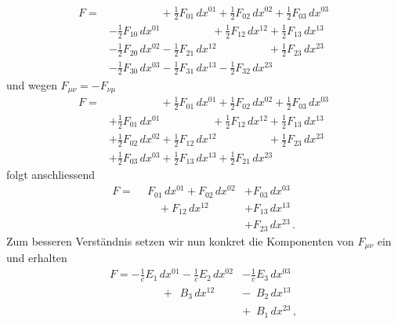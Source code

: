 \begin{align*}
	F
	=
	&\phantom{+ \frac{1}{2} F_{00} \, dx^{00}} + \frac{1}{2} F_{01} \, dx^{01} + \frac{1}{2} F_{02} \, dx^{02} + \frac{1}{2} F_{03} \, dx^{03}
	\\
	&- \frac{1}{2} F_{10} \, dx^{01} \phantom{+ \frac{1}{2} F_{11} \, dx^{11}} + \frac{1}{2} F_{12} \, dx^{12} + \frac{1}{2} F_{13} \, dx^{13}
	\\
	&- \frac{1}{2} F_{20} \, dx^{02} - \frac{1}{2} F_{21} \, dx^{12} \phantom{+ \frac{1}{2} F_{22} \, dx^{22}} + \frac{1}{2} F_{23} \, dx^{23}
	\\
	&- \frac{1}{2} F_{30} \, dx^{03} - \frac{1}{2} F_{31} \, dx^{13} - \frac{1}{2} F_{32} \, dx^{23} \phantom{+ \frac{1}{2} F_{33} \, dx^{33}}
\end{align*}
und wegen $F_{\mu\nu} = -F_{\nu\mu}$
\begin{align*}
	F
	=
	&\phantom{+ \frac{1}{2} F_{00} \, dx^{00}} + \frac{1}{2} F_{01} \, dx^{01} + \frac{1}{2} F_{02} \, dx^{02} + \frac{1}{2} F_{03} \, dx^{03}
	\\
	&+ \frac{1}{2} F_{01} \, dx^{01} \phantom{+ \frac{1}{2} F_{11} \, dx^{11}} + \frac{1}{2} F_{12} \, dx^{12} + \frac{1}{2} F_{13} \, dx^{13}
	\\
	&+ \frac{1}{2} F_{02} \, dx^{02} + \frac{1}{2} F_{12} \, dx^{12} \phantom{+ \frac{1}{2} F_{22} \, dx^{22}} + \frac{1}{2} F_{23} \, dx^{23}
	\\
	&+ \frac{1}{2} F_{03} \, dx^{03} + \frac{1}{2} F_{13} \, dx^{13} + \frac{1}{2} F_{21} \, dx^{23} \phantom{+ \frac{1}{2} F_{33} \, dx^{33}}
\end{align*}
folgt anschliessend
\begin{align*}
	F
	=
	\phantom{+} F_{01} \, dx^{01} + F_{02} \, dx^{02} &+ F_{03} \, dx^{03}
	\\
	\phantom{+ F_{11} \, dx^{11}} + F_{12} \, dx^{12} &+ F_{13} \, dx^{13}
	\\
	\phantom{+ F_{12} \, dx^{12}} \phantom{+ F_{22} \, dx^{22}} &+ F_{23} \, dx^{23} \, .
\end{align*}
Zum besseren Verständnis setzen wir nun konkret die Komponenten von $F_{\mu\nu}$ ein und erhalten
\begin{align*}
	F
	=
	- \frac{1}{c} E_1 \, dx^{01} - \frac{1}{c} E_2 \, dx^{02} &- \frac{1}{c} E_3 \, dx^{03}
	\\
	\phantom{+ \frac{1}{c} F_{11} \, dx^{11}} + \phantom{\frac{1}{c}} B_3 \, dx^{12} &- \phantom{\frac{1}{c}} B_2 \, dx^{13}
	\\
	\phantom{+ \frac{1}{c} F_{12} \, dx^{12}} \phantom{+ \frac{1}{c} F_{22} \, dx^{22}} &+ \phantom{\frac{1}{c}} B_1 \, dx^{23} \, ,
\end{align*}
